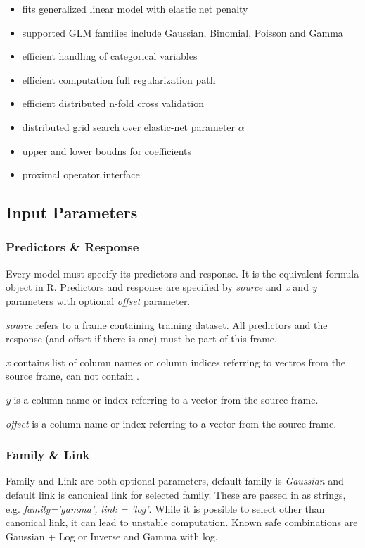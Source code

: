 \documentclass[11pt]{article}
\begin{document}
\begin{itemize} 
\item fits generalized linear model with elastic net penalty
\item supported GLM families include Gaussian, Binomial, Poisson and Gamma
\item efficient handling of categorical variables
\item efficient computation full regularization path
\item efficient distributed n-fold cross validation
\item distributed grid search over elastic-net parameter $\alpha$
\item upper and lower boudns for coefficients
\item proximal operator interface
\end{itemize}

\subsection{Input Parameters}
\subsubsection{Predictors \& Response}
Every model must specify its predictors and response. It is the equivalent formula object in R. Predictors and response are specified by \textit{source} and \textit{x} and \textit{y} parameters with optional \textit{offset} parameter. 

\textit{source} refers to a frame containing training dataset. All predictors and the response (and offset if there is one) must be part of this frame.

\textit{x} contains list of column names or column indices referring to vectros from the source frame, can not contain .

\textit{y} is a column name or index referring to a vector from the source frame.

\textit{offset} is a column name or index referring to a vector from the source frame.
  
\subsubsection{Family \& Link}
Family and Link are both optional parameters, default family is \textit{Gaussian} and default link is canonical link for selected family. These are passed in as strings, e.g. \textit{family='gamma', link = 'log'}.
While it is possible to select other than canonical link, it can lead to unstable computation. Known safe combinations are Gaussian + Log or Inverse and Gamma with log.  
\end{document}
